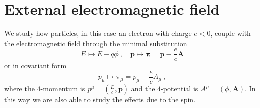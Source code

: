 \section{External electromagnetic field}

    We study how particles, in this case an electron with charge $e < 0$, couple with the electromagnetic field through the minimal substitution 
    \begin{equation*}
        E \mapsto E - q \phi ~, \quad \mathbf p \mapsto \boldsymbol \pi = \mathbf p - \frac{e}{c} \mathbf A
    \end{equation*}
    or in covariant form 
    \begin{equation}\label{minsub}
        p_\mu \mapsto \pi_\mu = p_\mu - \frac{e}{c} A_\mu  ~,
    \end{equation}
    where the $4$-momentum is $p^\mu = (\frac{E}{c}, \mathbf p)$ and the $4$-potential is $A^\mu = (\phi, \mathbf A)$. In this way we are also able to study the effects due to the spin.

